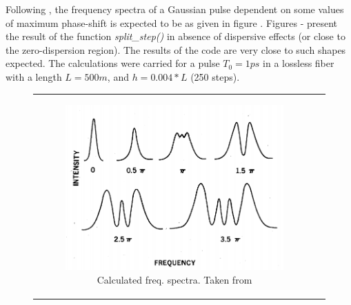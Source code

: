     Following \citep{stolen}, the frequency spectra of a Gaussian pulse dependent on some values of maximum phase-shift is expected to be as given in figure . Figures - present the result of the function \emph{split\_step()} in absence of dispersive effects (or close to the zero-dispersion region). The results of the code are very close to such shapes expected. The calculations were carried for a pulse $T_0 = 1ps$ in a lossless fiber with a length $L = 500m$, and $h = 0.004*L$ (250 steps).
    
     \begin{figure}[label={fig:spmssfm}, caption={Shape of the spectra for Gaussian pulses by maximum phase shift ($\phi_{NL}$).}]
         \centering	
         \begin{tabular}[c]{cc}
         \centering	
        \begin{subfigure}[b]{.53\textwidth}
		    \centering	
            \includegraphics[width=1\linewidth]{figures/chap3/ssfm_spm/stolen_SPM.png}
            \caption{Calculated freq. spectra. Taken from \citep{stolen}}
            \label{fig:spmstol}
        \end{subfigure}
        \hfill
        \begin{subfigure}[b]{.53\textwidth}
		    \centering	

\end{subfigure}
\end{tabular}
\end{figure}
